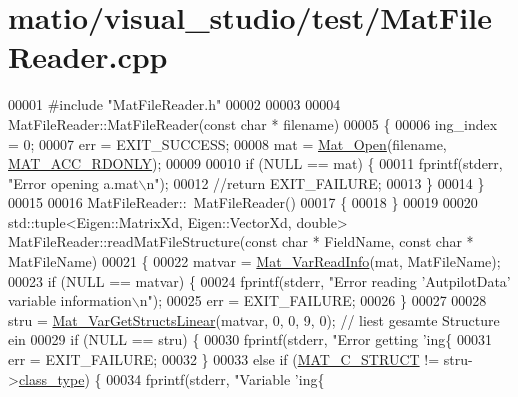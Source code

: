 \hypertarget{matio_2visual__studio_2test_2_mat_file_reader_8cpp_source}{}\section{matio/visual\+\_\+studio/test/\+Mat\+File\+Reader.cpp}
\label{matio_2visual__studio_2test_2_mat_file_reader_8cpp_source}

\begin{DoxyCode}
00001 \textcolor{preprocessor}{#include "MatFileReader.h"}
00002 
00003 
00004 MatFileReader::MatFileReader(\textcolor{keyword}{const} \textcolor{keywordtype}{char} * filename)
00005 \{
00006     ing\_index = 0;
00007     err = EXIT\_SUCCESS;
00008     mat = \hyperlink{group___m_a_t_gafbfedb5636a99f0ef867520c47f77d18}{Mat\_Open}(filename, \hyperlink{group___m_a_t_ggaa9dcbc70f538af79bd557593ff6b5cdba8dd1457651b27ba9bea6cfba158c037c}{MAT\_ACC\_RDONLY});
00009 
00010     \textcolor{keywordflow}{if} (NULL == mat) \{
00011         fprintf(stderr, \textcolor{stringliteral}{"Error opening a.mat\(\backslash\)n"});
00012         \textcolor{comment}{//return EXIT\_FAILURE;}
00013     \}
00014 \}
00015 
00016 MatFileReader::~MatFileReader()
00017 \{
00018 \}
00019 
00020 std::tuple<Eigen::MatrixXd, Eigen::VectorXd, double> MatFileReader::readMatFileStructure(\textcolor{keyword}{const} \textcolor{keywordtype}{char} * 
      FieldName, \textcolor{keyword}{const} \textcolor{keywordtype}{char} * MatFileName)
00021 \{
00022     matvar = \hyperlink{group___m_a_t_ga46da2e45ed96d3f1a6ec643757f2b086}{Mat\_VarReadInfo}(mat, MatFileName);
00023     \textcolor{keywordflow}{if} (NULL == matvar) \{
00024         fprintf(stderr, \textcolor{stringliteral}{"Error reading 'AutpilotData' variable information\(\backslash\)n"});
00025         err = EXIT\_FAILURE;
00026     \}
00027 
00028     stru = \hyperlink{group___m_a_t_gaa56680fb7b2cd3d410f659e945da8141}{Mat\_VarGetStructsLinear}(matvar, 0, 0, 9, 0); \textcolor{comment}{// liest gesamte Structure
       ein}
00029     \textcolor{keywordflow}{if} (NULL == stru) \{
00030         fprintf(stderr, \textcolor{stringliteral}{"Error getting 'ing\{%
00031         err = EXIT\_FAILURE;
00032     \}
00033     \textcolor{keywordflow}{else} \textcolor{keywordflow}{if} (\hyperlink{group___m_a_t_ggad4d60ae7b709fc81bfd744fb4c857c40acb467c7749c80902b798134c729bb521}{MAT\_C\_STRUCT} != stru->\hyperlink{group___m_a_t_aff13035bf3265dd7d9425e5d40c839d4}{class\_type}) \{
00034         fprintf(stderr, \textcolor{stringliteral}{"Variable 'ing\{%
}}
\end{DoxyCode}
